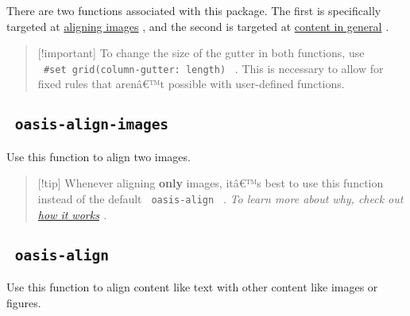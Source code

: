 
There are two functions associated with this package. The first is
specifically targeted at
\href{https://github.com/typst/packages/raw/main/packages/preview/oasis-align/0.1.0/\#oasis-align-images}{aligning
images} , and the second is targeted at
\href{https://github.com/typst/packages/raw/main/packages/preview/oasis-align/0.1.0/\#oasis-align-1}{content
in general} .

\begin{quote}
{[}!important{]} To change the size of the gutter in both functions, use
\texttt{\ \#set\ grid(column-gutter:\ length)\ } . This is necessary to
allow for fixed rules that arenâ€™t possible with user-defined
functions.
\end{quote}

\subsection{\texorpdfstring{\texttt{\ oasis-align-images\ }}{ oasis-align-images }}\label{oasis-align-images}

Use this function to align two images.

\begin{Shaded}
\begin{Highlighting}[]
\NormalTok{)}
\end{Highlighting}
\end{Shaded}

\begin{quote}
{[}!tip{]} Whenever aligning \textbf{only} images, itâ€™s best to use
this function instead of the default \texttt{\ oasis-align\ } . \emph{To
learn more about why, check out
\href{https://github.com/typst/packages/raw/main/packages/preview/oasis-align/0.1.0/\#how-it-works}{how
it works} .}
\end{quote}

\subsection{\texorpdfstring{\texttt{\ oasis-align\ }}{ oasis-align }}\label{oasis-align-1}

Use this function to align content like text with other content like
images or figures.

